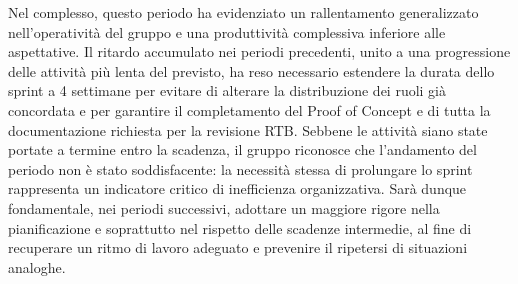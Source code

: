 \documentclass[a4paper, 11pt, oneside]{scrartcl} %
\begin{document}
Nel complesso, questo periodo ha evidenziato un rallentamento generalizzato nell'operatività del gruppo e una produttività complessiva inferiore alle aspettative. Il ritardo accumulato nei periodi precedenti, unito a una progressione delle attività più lenta del previsto, ha reso necessario estendere la durata dello sprint a 4 settimane per evitare di alterare la distribuzione dei ruoli già concordata e per garantire il completamento del Proof of Concept e di tutta la documentazione richiesta per la revisione RTB. Sebbene le attività siano state portate a termine entro la scadenza, il gruppo riconosce che l'andamento del periodo non è stato soddisfacente: la necessità stessa di prolungare lo sprint rappresenta un indicatore critico di inefficienza organizzativa. Sarà dunque fondamentale, nei periodi successivi, adottare un maggiore rigore nella pianificazione e soprattutto nel rispetto delle scadenze intermedie, al fine di recuperare un ritmo di lavoro adeguato e prevenire il ripetersi di situazioni analoghe.

\newpage

\end{document}
